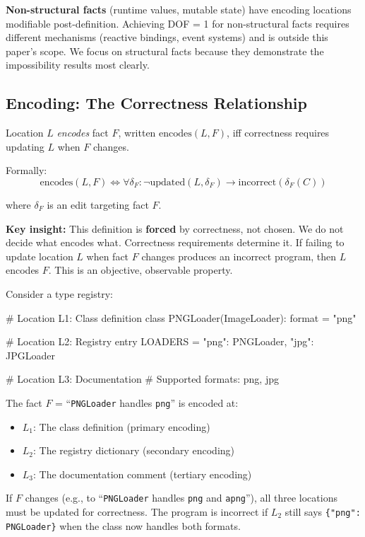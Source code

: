 \textbf{Non-structural facts} (runtime values, mutable state) have encoding locations modifiable post-definition. Achieving DOF = 1 for non-structural facts requires different mechanisms (reactive bindings, event systems) and is outside this paper's scope. We focus on structural facts because they demonstrate the impossibility results most clearly.

\subsection{Encoding: The Correctness Relationship}\label{sec:encoding}

\begin{definition}[Encodes]\label{def:encodes}
Location $L$ \emph{encodes} fact $F$, written $\text{encodes}(L, F)$, iff correctness requires updating $L$ when $F$ changes.

Formally:
\[
\text{encodes}(L, F) \Longleftrightarrow \forall \delta_F: \neg\text{updated}(L, \delta_F) \rightarrow \text{incorrect}(\delta_F(C))
\]

where $\delta_F$ is an edit targeting fact $F$.
\end{definition}

\textbf{Key insight:} This definition is \textbf{forced} by correctness, not chosen. We do not decide what encodes what. Correctness requirements determine it. If failing to update location $L$ when fact $F$ changes produces an incorrect program, then $L$ encodes $F$. This is an objective, observable property.

\begin{example}\label{ex:encoding}
Consider a type registry:

\begin{code}
# Location L1: Class definition
class PNGLoader(ImageLoader):
    format = "png"

# Location L2: Registry entry
LOADERS = {"png": PNGLoader, "jpg": JPGLoader}

# Location L3: Documentation
# Supported formats: png, jpg
\end{code}

The fact $F$ = ``\texttt{PNGLoader} handles \texttt{png}'' is encoded at:
\begin{itemize}
\tightlist
\item $L_1$: The class definition (primary encoding)
\item $L_2$: The registry dictionary (secondary encoding)
\item $L_3$: The documentation comment (tertiary encoding)
\end{itemize}

If $F$ changes (e.g., to ``\texttt{PNGLoader} handles \texttt{png} and \texttt{apng}''), all three locations must be updated for correctness. The program is incorrect if $L_2$ still says \texttt{\{"png": PNGLoader\}} when the class now handles both formats.
\end{example}

